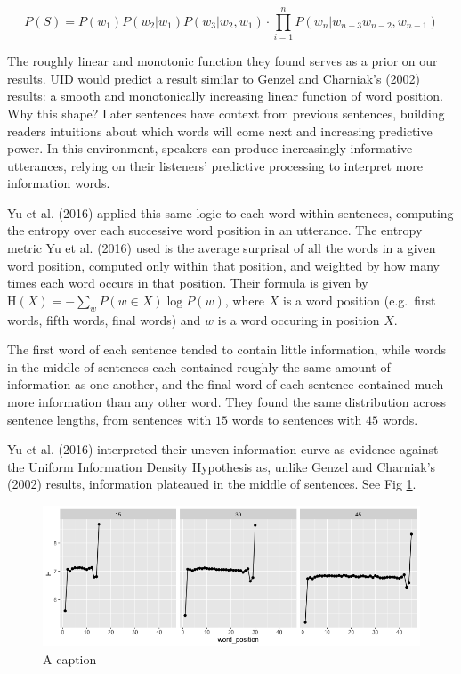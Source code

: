 \documentclass[
  english,
  man,floatsintext]{apa6}
\begin{document}
\[P(S) = P(w_1) P(w_2 | w_1) P(w_3 | w_2, w_1) \cdot \prod\limits_{i=1}^n P(w_n | w_{n-3} w_{n-2}, w_{n-1})\]

The roughly linear and monotonic function they found serves as a prior on our results. UID would predict a result similar to Genzel and Charniak's (2002) results: a smooth and monotonically increasing linear function of word position. Why this shape? Later sentences have context from previous sentences, building readers intuitions about which words will come next and increasing predictive power. In this environment, speakers can produce increasingly informative utterances, relying on their listeners' predictive processing to interpret more information words.

Yu et al. (2016) applied this same logic to each word within sentences, computing the entropy over each successive word position in an utterance. The entropy metric Yu et al. (2016) used is the average surprisal of all the words in a given word position, computed only within that position, and weighted by how many times each word occurs in that position. Their formula is given by \(\text{H}(X) = -\sum_{w}P(w \in X) \log P(w)\), where \(X\) is a word position (e.g.~first words, fifth words, final words) and \(w\) is a word occuring in position \(X\).

The first word of each sentence tended to contain little information, while words in the middle of sentences each contained roughly the same amount of information as one another, and the final word of each sentence contained much more information than any other word. They found the same distribution across sentence lengths, from sentences with \(15\) words to sentences with \(45\) words.

Yu et al. (2016) interpreted their uneven information curve as evidence against the Uniform Information Density Hypothesis as, unlike Genzel and Charniak's (2002) results, information plateaued in the middle of sentences. See Fig \ref{fig:bnc-yu}.

\begin{figure}[tb]
\includegraphics[width=1\linewidth]{figs/bnc-yu} \caption{A caption}\label{fig:bnc-yu}
\end{figure}
\end{document}
